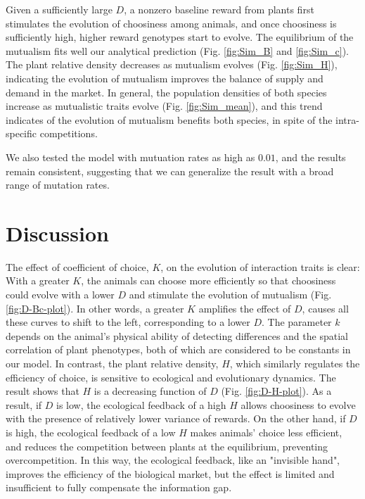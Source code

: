 \documentclass[12pt]{article}
\begin{document}
Given a sufficiently large $D$, a nonzero baseline reward from plants first stimulates the evolution of choosiness among animals, and once choosiness is sufficiently high, higher reward genotypes start to evolve. The equilibrium of the mutualism fits well our analytical prediction (Fig. \ref{fig:Sim_B} and \ref{fig:Sim_c}). The plant relative density decreases as mutualism evolves (Fig. \ref{fig:Sim_H}), indicating the evolution of mutualism improves the balance of supply and demand in the market. In general, the population densities of both species increase as mutualistic traits evolve (Fig. \ref{fig:Sim_mean}), and this trend indicates of the evolution of mutualism benefits both species, in spite of the intra-specific competitions.

We also tested the model with mutuation rates as high as $0.01$, and the results remain consistent, suggesting that we can generalize the result with a broad range of mutation rates.

\section*{Discussion}



The effect of coefficient of choice, $K$, on the evolution of interaction traits is clear: With a greater $K$, the animals can choose more efficiently so that choosiness could evolve with a lower $D$ and stimulate the evolution of mutualism (Fig. \ref{fig:D-Bc-plot}). In other words, a greater $K$ amplifies the effect of $D$, causes all these curves to shift to the left, corresponding to a lower $D$. The parameter $k$ depends on the animal's physical ability of detecting differences and the spatial correlation of plant phenotypes, both of which are considered to be constants in our model. In contrast, the plant relative density, $H$, which similarly regulates the efficiency of choice, is sensitive to ecological and evolutionary dynamics. The result shows that $H$ is a decreasing function of $D$ (Fig. \ref{fig:D-H-plot}). As a result, if $D$ is low, the ecological feedback of a high $H$ allows choosiness to evolve with the presence of relatively lower variance of rewards. On the other hand, if $D$ is high, the ecological feedback of a low $H$ makes animals' choice less efficient, and reduces the competition between plants at the equilibrium, preventing overcompetition. In this way, the ecological feedback, like an "invisible hand", improves the efficiency of the biological market, but the effect is limited and insufficient to fully compensate the information gap. 
\end{document}
